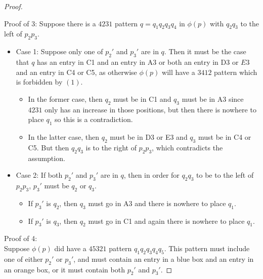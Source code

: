 \documentclass[11pt]{amsart}
\theoremstyle{remark}
\numberwithin{equation}{section}
\begin{document}
\begin{proof}
\begin{itemize}
    \end{itemize}
     

    \vspace{10pt}
    
    Proof of 3: Suppose there is a $4231$ pattern $q=q_1q_2q_3q_4$ in $\phi(p)$ with $q_2q_3$ to the left of $p_2p_3$.
    \begin{itemize}
        \item Case 1: Suppose only one of $p_2'$ and $p_3'$ are in $q$. Then it must be the case that $q$ has an entry in C1 and an entry in A3 or both an entry in D3 or $E3$ and an entry in C4 or C5, as otherwise $\phi(p)$ will have a $3412$ pattern which is forbidden by $(1)$.
        \begin{itemize}
            \item In the former case, then $q_2$ must be in C1 and $q_3$ must be in A3 since $4231$ only has an increase in those positions, but then there is nowhere to place $q_1$ so this is a contradiction. 
            \item In the latter case, then $q_2$ must be in D3 or E3 and $q_3$ must be in C4 or C5. But then $q_2q_3$ is to the right of $p_2p_3$, which contradicts the assumption.
        \end{itemize}
        \item Case 2: If both $p_2'$ and $p_3'$ are in $q$, then in order for $q_2q_3$ to be to the left of $p_2p_3$, $p_3'$ must be $q_2$ or $q_3$. 
        \begin{itemize}
            \item If $p_3'$ is $q_2$, then $q_3$ must go in A3 and there is nowhere to place $q_1$.
            \item If $p_3'$ is $q_3$, then $q_2$ must go in C1 and again there is nowhere to place $q_1$.
        \end{itemize}
    \end{itemize}


    \vspace{10pt}
    
    Proof of 4:
    \\
    Suppose $\phi(p)$ did have a $45321$ pattern $q_1q_2q_3q_4q_5$. This pattern must include one of either $p_2'$ or $p_3'$, and must contain an entry in a blue box and an entry in an orange box, or it must contain both $p_2'$ and $p_3'$.


\end{proof}
\end{document}
